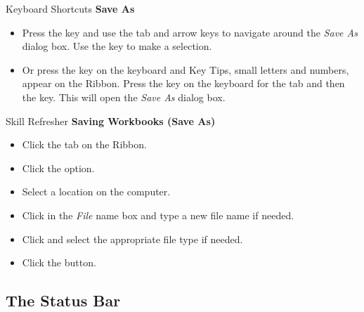 \begin{center}
	\begin{shtcutbox}{Keyboard Shortcuts}
		\textbf{Save As}
		\\
		\begin{itemize}
			\setlength{\itemsep}{0pt}
			\setlength{\parskip}{0pt}
			\setlength{\parsep}{0pt}
			
			\item Press the  key and use the tab and arrow keys to navigate around the \textit{Save As} dialog box. Use the  key to make a selection.
			\item Or press the  key on the keyboard and Key Tips, small letters and numbers, appear on the Ribbon. Press the  key on the keyboard for the  tab and then the  key. This will open the \textit{Save As} dialog box.
			
		\end{itemize}
	\end{shtcutbox}
\end{center}

\begin{center}
	\begin{sklbox}{Skill Refresher}
		\textbf{Saving Workbooks (Save As)}
		\\
		\begin{itemize}
			\setlength{\itemsep}{0pt}
			\setlength{\parskip}{0pt}
			\setlength{\parsep}{0pt}
			
			\item Click the  tab on the Ribbon.
			\item Click the  option.
			\item Select a location on the computer.
			\item Click in the \textit{File} name box and type a new file name if needed.
			\item Click  and select the appropriate file type if needed.
			\item Click the  button.
		
		\end{itemize}
	\end{sklbox}
\end{center}

\subsection{The Status Bar}

